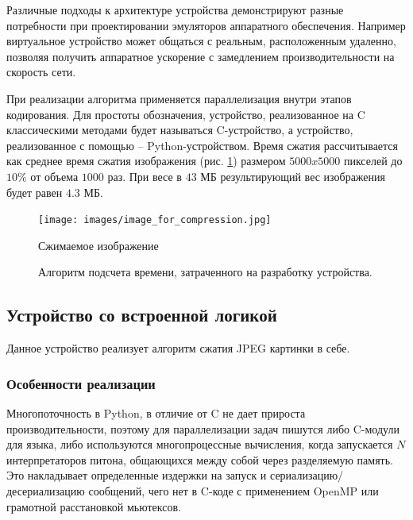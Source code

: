 Различные подходы к архитектуре устройства демонстрируют
разные потребности при проектировании эмуляторов аппаратного обеспечения.
Например виртуальное устройство может общаться с реальным, расположенным удаленно,
позволяя получить аппаратное ускорение с замедлением производительности на
скорость сети.

При реализации алгоритма применяется параллелизация внутри этапов кодирования.
Для простоты обозначения, устройство, реализованное на C классическими
методами будет называться C-устройство, а устройство, реализованное с помощью {\mylanguage} --
Python-устройством.
Время сжатия рассчитывается как среднее время сжатия изображения (рис. \ref{fig:image-for-compression})
размером $5000x5000$ пикселей до $10\%$ от объема $1000$ раз.
При весе в $43$ МБ результирующий вес изображения будет равен $4.3$ МБ.


\begin{figure}[!htbp]
    \centering
    \begin{adjustbox}{max totalsize={\textwidth}{\textheight}}
        \texttt{[image: images/image\_for\_compression.jpg]}
    \end{adjustbox}
    \caption{Сжимаемое изображение}\label{fig:image-for-compression}
\end{figure}


\begin{figure}[!htbp]
    \centering
    
    \caption{Алгоритм подсчета времени, затраченного на разработку устройства.}\label{fig:git-hours}
\end{figure}

\subsection{Устройство со встроенной логикой}\label{sec:ch3/sec2/sec1}

Данное устройство реализует алгоритм сжатия JPEG картинки в себе.

\subsubsection{Особенности реализации}\label{sec:ch3/sec2/sec1/sec1}

Многопоточность в Python, в отличие от C не дает прироста производительности,
поэтому для параллелизации задач пишутся либо C-модули для языка, либо используются
многопроцессные вычисления, когда запускается $N$ интерпретаторов питона, общающихся
между собой через разделяемую память. Это накладывает определенные издержки на запуск
и сериализацию/десериализацию сообщений, чего нет в C-коде с применением OpenMP или
грамотной расстановкой мьютексов.

